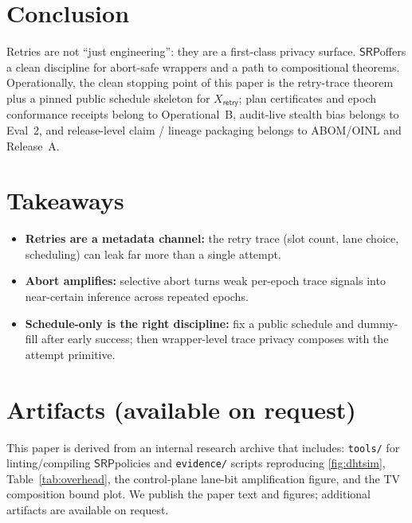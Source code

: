 \documentclass[11pt]{article}
\newcommand{\SRP}{\ensuremath{\mathsf{SRP}}}
\begin{document}
\section{Conclusion}
Retries are not ``just engineering'': they are a first-class privacy surface.
\SRP offers a clean discipline for abort-safe wrappers and a path to compositional theorems.
Operationally, the clean stopping point of this paper is the retry-trace theorem plus a pinned public schedule skeleton for $X_{\mathsf{retry}}$; plan certificates and epoch conformance receipts belong to Operational~B, audit-live stealth bias belongs to Eval~2, and release-level claim / lineage packaging belongs to ABOM/OINL and Release~A.\cite{series:operationalB,series:advantagecontracts,series:releaseproperty}

\section{Takeaways}
\begin{itemize}[leftmargin=*]
\item \textbf{Retries are a metadata channel:} the retry trace (slot count, lane choice, scheduling) can leak far more than a single attempt.
\item \textbf{Abort amplifies:} selective abort turns weak per-epoch trace signals into near-certain inference across repeated epochs.
\item \textbf{Schedule-only is the right discipline:} fix a public schedule and dummy-fill after early success; then wrapper-level trace privacy composes with the attempt primitive.
\end{itemize}

\section*{Artifacts (available on request)}
This paper is derived from an internal research archive that includes:
\texttt{tools/} for linting/compiling \SRP policies and \texttt{evidence/} scripts reproducing \cref{fig:dhtsim}, Table~\ref{tab:overhead}, the control-plane lane-bit amplification figure, and the TV composition bound plot.
We publish the paper text and figures; additional artifacts are available on request.
\end{document}
